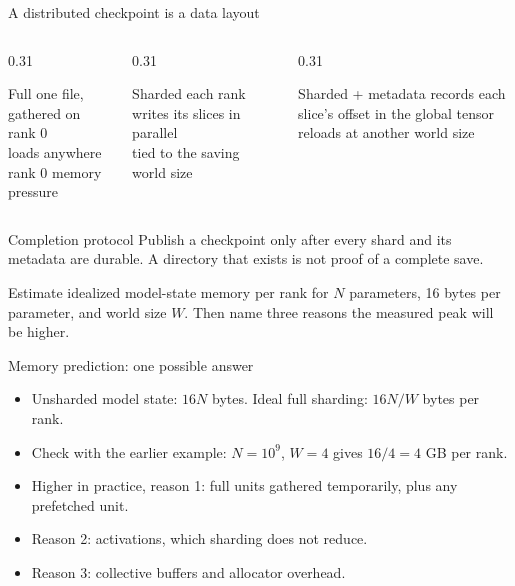 \documentclass[handout]{beamer}
\begin{document}
\begin{frame}{A distributed checkpoint is a data layout}
  \begin{columns}[t]
    \begin{column}{0.31\linewidth}
      \begin{block}{Full}
        one file, gathered on rank 0\\loads anywhere\\rank 0 memory pressure
      \end{block}
    \end{column}
    \begin{column}{0.31\linewidth}
      \begin{block}{Sharded}
        each rank writes its slices in parallel\\tied to the saving world size
      \end{block}
    \end{column}
    \begin{column}{0.31\linewidth}
      \begin{block}{Sharded + metadata}
        records each slice's offset in the global tensor\\reloads at another world size
      \end{block}
    \end{column}
  \end{columns}
  \begin{alertblock}{Completion protocol}
    Publish a checkpoint only after every shard and its metadata are durable. A directory that exists is not proof of a complete save.
  \end{alertblock}
\end{frame}

{Estimate idealized model-state memory per rank for $N$ parameters, 16 bytes per parameter, and world size $W$. Then name three reasons the measured peak will be higher.}

\begin{frame}{Memory prediction: one possible answer}
  \begin{itemize}
      \setlength{\itemsep}{9pt}
    \item Unsharded model state: $16N$ bytes. Ideal full sharding: $16N/W$ bytes per rank.
    \item Check with the earlier example: $N=10^9$, $W=4$ gives $16/4=4$ GB per rank.
    \item Higher in practice, reason 1: full units gathered temporarily, plus any prefetched unit.
    \item Reason 2: activations, which sharding does not reduce.
    \item Reason 3: collective buffers and allocator overhead.
  \end{itemize}
\end{frame}
\end{document}
